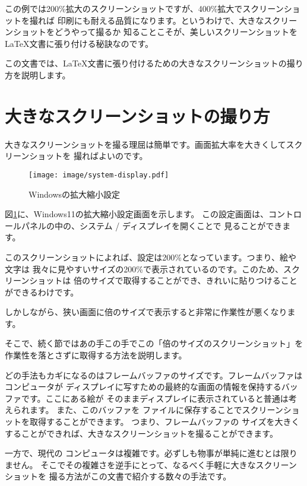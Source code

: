 この例では200\%拡大のスクリーンショットですが、400\%拡大でスクリーンショットを撮れば
印刷にも耐える品質になります。というわけで、大きなスクリーンショットをどうやって撮るか
知ることこそが、美しいスクリーンショットを\LaTeX 文書に張り付ける秘訣なのです。

この文書では、\LaTeX 文書に張り付けるための大きなスクリーンショットの撮り方を説明します。

\section{大きなスクリーンショットの撮り方}
大きなスクリーンショットを撮る理屈は簡単です。画面拡大率を大きくしてスクリーンショットを
撮ればよいのです。

\begin{figure}[bp]
  \begin{center}
    \texttt{[image: image/system-display.pdf]}
    \caption{Windowsの拡大縮小設定} \label{fig:system-display}
  \end{center}
\end{figure}

図\ref{fig:system-display}に、Windows11の拡大縮小設定画面を示します。
この設定画面は、コントロールパネルの中の、システム / ディスプレイを開くことで
見ることができます。

このスクリーンショットによれば、設定は200\%となっています。つまり、絵や文字は
我々に見やすいサイズの200\%で表示されているのです。このため、スクリーンショットは
倍のサイズで取得することができ、きれいに貼りつけることができるわけです。

しかしながら、狭い画面に倍のサイズで表示すると非常に作業性が悪くなります。

そこで、続く節ではあの手この手でこの「倍のサイズのスクリーンショット」を
作業性を落とさずに取得する方法を説明します。

どの手法もカギになるのはフレームバッファのサイズです。フレームバッファはコンピュータが
ディスプレイに写すための最終的な画面の情報を保持するバッファです。ここにある絵が
そのままディスプレイに表示されていると普通は考えられます。
また、このバッファを
ファイルに保存することでスクリーンショットを取得することができます。
つまり、フレームバッファの
サイズを大きくすることができれば、大きなスクリーンショットを撮ることができます。


一方で、現代の
コンピュータは複雑です。必ずしも物事が単純に進むとは限りません。
そこでその複雑さを逆手にとって、なるべく手軽に大きなスクリーンショットを
撮る方法がこの文書で紹介する数々の手法です。

